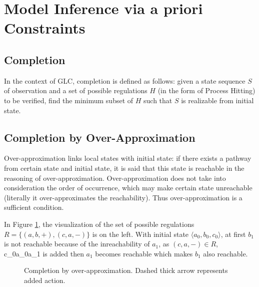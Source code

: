 \section{Model Inference via a priori Constraints}
\subsection{Completion}
In the context of GLC, completion is defined as follows: given a state sequence $S$ of observation and a set of possible regulations $H$ (in the form of Process Hitting) to be verified,  find the minimum subset of $H$ such that $S$ is realizable from initial state. 
\subsection{Completion by Over-Approximation}
Over-approximation links local states with initial state: if there exists a pathway from certain state and initial state, it is said that this state is reachable in the reasoning of over-approximation. Over-approximation does not take into consideration the order of occurrence, which may make certain state unreachable (literally it over-approximates the reachability). Thus over-approximation is a sufficient condition.\par
In Figure \ref{CompOv}, the visualization of the set of possible regulations $R=\{(a,b,+),(c,a,-)\}$ is on the left. With initial state $\langle a_0,b_0,c_0\rangle$, at first $b_1$ is not reachable because of the inreachability of $a_1$, as $(c,a,-)\in R$, \ac{c_0}{a_0}{a_1} is added then $a_1$ becomes reachable which makes $b_1$ also reachable.
\begin{figure}[ht]
\centering
{}\qquad
{}
\caption{Completion by over-approximation. Dashed thick arrow represents added action.}\label{CompOv}
\end{figure}

